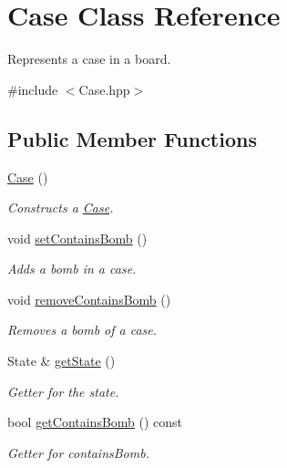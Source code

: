 \hypertarget{class_case}{}\section{Case Class Reference}
\label{class_case}


Represents a case in a board.  




{\ttfamily \#include $<$Case.\+hpp$>$}

\subsection*{Public Member Functions}
\begin{DoxyCompactItemize}
\item 
\mbox{\label{class_case_a14237e17aab1829965adab76b747db6c}} 
\hyperlink{class_case_a14237e17aab1829965adab76b747db6c}{Case} ()
\begin{DoxyCompactList}\small\item\em Constructs a \hyperlink{class_case}{Case}. \end{DoxyCompactList}\item 
\mbox{\label{class_case_a477a2982a26cb382de7f154828a1c15a}} 
void \hyperlink{class_case_a477a2982a26cb382de7f154828a1c15a}{set\+Contains\+Bomb} ()
\begin{DoxyCompactList}\small\item\em Adds a bomb in a case. \end{DoxyCompactList}\item 
\mbox{\label{class_case_ab907871025ce08f4a873e3bf2536b659}} 
void \hyperlink{class_case_ab907871025ce08f4a873e3bf2536b659}{remove\+Contains\+Bomb} ()
\begin{DoxyCompactList}\small\item\em Removes a bomb of a case. \end{DoxyCompactList}\item 
State \& \hyperlink{class_case_a2b5ed0f60c9827735d9b782f50fe7d04}{get\+State} ()
\begin{DoxyCompactList}\small\item\em Getter for the state. \end{DoxyCompactList}\item 
bool \hyperlink{class_case_ab776d3e52ca8b9183e20cc301cfa062f}{get\+Contains\+Bomb} () const
\begin{DoxyCompactList}\small\item\em Getter for contains\+Bomb. \end{DoxyCompactList}\item 

\end{DoxyCompactItemize}
